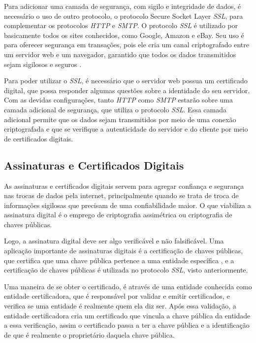 Para adicionar uma camada de segurança, com sigilo e integridade de dados, é necessário
o uso de outro protocolo, o protocolo Secure Socket Layer \textit{SSL}, para 
complementar os protocolos \textit{HTTP} e \textit{SMTP}. O protocolo \textit{SSL} 
é utilizado por basicamente todos os sites conhecidos, como Google,
Amazon e eBay. Seu uso é para oferecer segurança em transações, pois ele cria um
canal criptografado entre um servidor web e um navegador, garantido que todos os
dados transmitidos sejam sigilosos e seguros \cite{kurose2010redes}. 

Para poder utilizar o \textit{SSL}, é necessário que o servidor web 
possua um certificado digital, que possa responder algumas questões sobre a 
identidade do seu servidor. Com as devidas configurações, tanto \textit{HTTP} como 
\textit{SMTP} estarão sobre uma camada adicional de segurança, que utiliza o 
protocolo \textit{SSL}. Essa camada adicional permite que os dados sejam 
transmitidos por meio de uma conexão criptografada e que se verifique a autenticidade
do servidor e do cliente por meio de certificados digitais. 

\subsection{Assinaturas e Certificados Digitais}

As assinaturas e certificados digitais servem para agregar confiança e segurança
nas trocas de dados pela internet, principalmente quando se trata de troca de informações
sigilosas que precisam de uma confiabilidade maior. O que viabiliza a assinatura 
digital é o emprego de criptografia assimétrica ou criptografia de chaves públicas. 

Logo, a assinatura digital deve ser algo verificável e não falsificável. Uma
aplicação importante de assinaturas digitais é a certificação de chaves públicas,
que certifica que uma chave pública pertence a uma entidade específica \cite{kurose2010redes},
e a certificação de chaves públicas é utilizada no protocolo \textit{SSL}, visto anteriormente.

Uma maneira de se obter o certificado, é através de uma entidade conhecida como
entidade certificadora, que é responsável por validar e emitir certificados, e
verifica se uma entidade é realmente quem ela diz ser. Após essa validação, a
entidade certificadora cria um certificado que vincula a chave pública da entidade
a essa verificação, assim o certificado passa a ter a chave pública e a
identificação de que é realmente o proprietário daquela chave pública.

